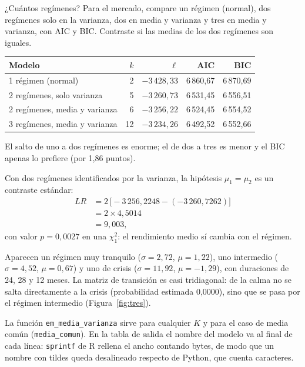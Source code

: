 \begin{ejresuelto}{¿Cuántos regímenes?}\label{ej:numero}
\enunciado Para el mercado, compare un régimen (normal), dos regímenes solo en la varianza, dos en media y varianza y tres en
media y varianza, con AIC y BIC. Contraste si las medias de los dos regímenes son iguales.

\solucion
{}
\begin{center}\small
\begin{tabular}{@{}lrrrr@{}}
\toprule
Modelo & $k$ & $\ell$ & AIC & BIC \\
\midrule
1 régimen (normal) & 2 & $-3\,428{,}33$ & 6\,860,67 & 6\,870,69 \\
2 regímenes, solo varianza & 5 & $-3\,260{,}73$ & 6\,531,45 & 6\,556,51 \\
2 regímenes, media y varianza & 6 & $-3\,256{,}22$ & 6\,524,45 & 6\,554,52 \\
3 regímenes, media y varianza & 12 & $-3\,234{,}26$ & 6\,492,52 & 6\,552,66 \\
\bottomrule
\end{tabular}
\end{center}
El salto de uno a dos regímenes es enorme; el de dos a tres es menor y el BIC apenas lo prefiere (por 1,86 puntos).

 Con dos regímenes identificados por la varianza, la hipótesis $\mu_1=\mu_2$ es un contraste
estándar:
\begin{align*}
  LR &= 2\,\bigl[-3\,256{,}2248-(-3\,260{,}7262)\bigr]\\
     &= 2\times4{,}5014\\
     &= 9{,}003,
\end{align*}
con valor $p=0{,}0027$ en una $\chi^2_1$: el rendimiento medio sí cambia con el régimen.

 Aparecen un régimen muy tranquilo ($\sigma=2{,}72$, $\mu=1{,}22$), uno intermedio
($\sigma=4{,}52$, $\mu=0{,}67$) y uno de crisis ($\sigma=11{,}92$, $\mu=-1{,}29$), con duraciones de 24, 28 y 12 meses. La matriz de
transición es casi tridiagonal: de la calma no se salta directamente a la crisis (probabilidad estimada 0,0000), sino que se
pasa por el régimen intermedio (Figura~\ref{fig:tres}).


\RvsPy La función \texttt{em\_media\_varianza} sirve para cualquier $K$ y para el caso de media común
(\texttt{media\_comun}). En la tabla de salida el nombre del modelo va al final de cada línea: \texttt{sprintf} de R rellena
el ancho contando bytes, de modo que un nombre con tildes queda desalineado respecto de Python, que cuenta caracteres.


\end{ejresuelto}
